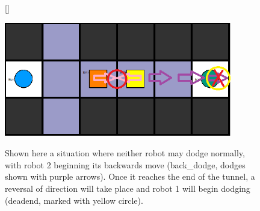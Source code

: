 \documentclass{llncs}
\begin{document}
\begin{figure}
[\FBwidth]
{\caption{Shown here a situation where neither robot may dodge normally, with robot 2 beginning its backwards move (back\_dodge, dodges shown with purple arrows). Once it reaches the end of the tunnel, a reversal of direction will take place and robot 1 will begin dodging (deadend, marked with yellow circle).}\label{fig:test}}
{\includegraphics[width=\textwidth, height= 5cm, keepaspectratio]{deadend}}
\end{figure}
\end{document}
